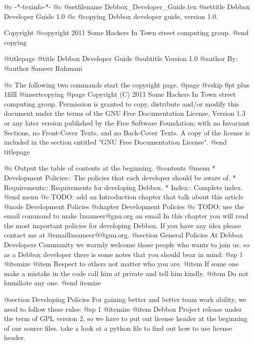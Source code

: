    @c -*-texinfo-*-
@c %
@setfilename Debbox_Developer_Guide.tex
@settitle Debbox Developer Guide 1.0
@c %
@copying
Debbox developer guide, version 1.0.

Copyright @copyright{} 2011 Some Hackers In Town street computing group.
@end copying

@titlepage
@title Debbox Developer Guide
@subtitle Version 1.0
@author By:
@author Sameer Rahmani

@c The following two commands start the copyright page.
@page
@vskip 0pt plus 1filll
@insertcopying
@page
Copyright (C)  2011  Some Hackers In Town street computing group.
Permission is granted to copy, distribute and/or modify this document
under the terms of the GNU Free Documentation License, Version 1.3
or any later version published by the Free Software Foundation;
with no Invariant Sections, no Front-Cover Texts, and no Back-Cover Texts.
A copy of the license is included in the section entitled "GNU
Free Documentation License".
@end titlepage

@c Output the table of contents at the beginning.
@contents
@menu
* Development Policies::        The policies that each developer should be aware of.
* Requirements::        Requirements for developing Debbox.
* Index::            Complete index.
@end menu
@c TODO: add an Introduction chapter that talk about this article
@node Development Policies
@chapter Development Policies
@c TODO: use the email command to make lxsameer@gnu.org an email
In this chapter you will read the most important policies for developing Debbox. If you have any idea please contact me at @email{lxsameer@@gnu.org}.
@section General Policies    
At Debbox Developers Community we warmly welcome those people who wants to join us. so
as a Debbox developer there is some notes that you should bear in mind:
@sp 1
@itemize
@item
Respect to others not matter who you are.
@item
If some one make a mistake in the code call him at private and tell him kindly.
@item
Do not humiliate any one.
@end itemize

@section Developing Policies
For gaining better and better team work ability, we need to follow these rulse:
@sp 1
@itemize
@item
Debbox Project release under the term of GPL version 2, so we have to put out license
header at the beginning of our source files. take a look at a python file to find out how to use 
license header.


